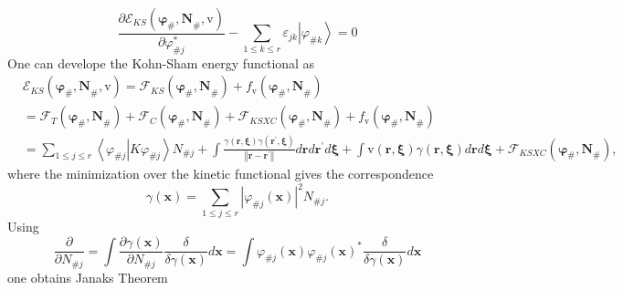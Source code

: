 \documentclass[aps,preprint]{revtex4}%
\begin{document}
\[
\frac{\partial\mathcal{E}_{KS}\left(  \mathbf{\varphi}_{\#}\mathbf{,N}%
_{\#}\mathbf{,}\mathrm{v}\right)  }{\partial\varphi_{\#j}^{\ast}}-\sum_{1\leq
k\leq r}\varepsilon_{jk}\left\vert \varphi_{\#k}\right\rangle =0
\]
One can develope the Kohn-Sham energy functional as%
\begin{align}
&  \mathcal{E}_{KS}\left(  \mathbf{\varphi}_{\#}\mathbf{,N}_{\#}%
\mathbf{,}\mathrm{v}\right)  =\mathcal{F}_{KS}\left(  \mathbf{\varphi}%
_{\#}\mathbf{,N}_{\#}\right)  +f_{\mathrm{v}}\left(  \mathbf{\varphi}%
_{\#}\mathbf{,N}_{\#}\right) \nonumber\\
&  =\mathcal{F}_{T}\left(  \mathbf{\varphi}_{\#}\mathbf{,N}_{\#}\right)
+\mathcal{F}_{C}\left(  \mathbf{\varphi}_{\#}\mathbf{,N}_{\#}\right)
+\mathcal{F}_{KSXC}\left(  \mathbf{\varphi}_{\#}\mathbf{,N}_{\#}\right)
+f_{\mathrm{v}}\left(  \mathbf{\varphi}_{\#}\mathbf{,N}_{\#}\right)
\nonumber\\
&  =\sum_{1\leq j\leq r}\left\langle \varphi_{\#j}\left\vert K\varphi
_{\#j}\right.  \right\rangle N_{\#j}+\int\frac{\gamma\left(  \mathbf{r,\xi
}\right)  \gamma\left(  \mathbf{r}^{\prime}\mathbf{,\xi}\right)  }{\left\Vert
\mathbf{r-r}^{\prime}\right\Vert }d\mathbf{r}d\mathbf{r}^{\prime}d\mathbf{\xi
}+\int\mathrm{v}\left(  \mathbf{r,\xi}\right)  \gamma\left(  \mathbf{r,\xi
}\right)  d\mathbf{r}d\mathbf{\xi}+\mathcal{F}_{KSXC}\left(  \mathbf{\varphi
}_{\#}\mathbf{,N}_{\#}\right)  ,
\end{align}
where the minimization over the kinetic functional gives the correspondence
\begin{equation}
\gamma\left(  \mathbf{x}\right)  =\sum_{1\leq j\leq r}\left\vert \varphi
_{\#j}\left(  \mathbf{x}\right)  \right\vert ^{2}N_{\#j}.
\end{equation}
Using
\[
\frac{\partial}{\partial N_{\#j}}=\int\frac{\partial\gamma\left(
\mathbf{x}\right)  }{\partial N_{\#j}}\frac{\delta}{\delta\gamma\left(
\mathbf{x}\right)  }d\mathbf{x=}\int\varphi_{\#j}\left(  \mathbf{x}\right)
\varphi_{\#j}\left(  \mathbf{x}\right)  ^{\ast}\frac{\delta}{\delta
\gamma\left(  \mathbf{x}\right)  }d\mathbf{x}%
\]
one obtains Janaks Theorem
\end{document}
